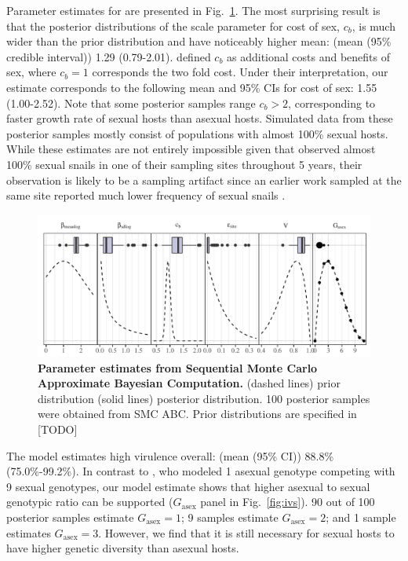 \documentclass{article}\usepackage[]{graphicx}\usepackage[]{color}
\newcommand{\fref}[1]{Fig.~\ref{fig:#1}}
\begin{document}
Parameter estimates for \cite{vergara2014infection} are presented in \fref{smcparam}.
The most surprising result is that the posterior distributions of the scale parameter for cost of sex, $c_b$, is much wider than the prior distribution and have noticeably higher mean: (mean (95\% credible interval)) 1.29 (0.79-2.01).
\cite{ashby2015diversity} defined $c_b$ as additional costs and benefits of sex, where $c_b=1$ corresponds the two fold cost.
Under their interpretation, our estimate corresponds to the following mean and 95\% CIs for cost of sex: 1.55 (1.00-2.52).
Note that some posterior samples range $c_b > 2$, corresponding to faster growth rate of sexual hosts than asexual hosts.
Simulated data from these posterior samples mostly consist of populations with almost 100\% sexual hosts.
While these estimates are not entirely impossible given that \cite{vergara2014infection} observed almost 100\% sexual snails in one of their sampling sites throughout 5 years, their observation is likely to be a sampling artifact since an earlier work sampled at the same site reported much lower frequency of sexual snails \citep{vergara2013geographic}. %

\begin{figure}[!htp]
\includegraphics[width=\textwidth]{../fig/verg_post.pdf}
\caption{{\bf Parameter estimates from Sequential Monte Carlo Approximate Bayesian Computation.}
(dashed lines) prior distribution (solid lines) posterior distribution. 100 posterior samples were obtained from SMC ABC. Prior distributions are specified in [TODO]
}
\label{fig:smcparam}
\end{figure}

The model estimates high virulence overall: (mean (95\% CI)) 88.8\% (75.0\%-99.2\%).
In contrast to \cite{lively2010epidemiological}, who modeled 1 asexual genotype competing with 9 sexual genotypes, our model estimate shows that higher asexual to sexual genotypic ratio can be supported ($G_{\textrm{asex}}$ panel in \fref{ivs}).
90 out of 100 posterior samples estimate $G_{\textrm{asex}} = 1$; 9 samples estimate $G_{\textrm{asex}} = 2$; and 1 sample estimates $G_{\textrm{asex}} = 3$.
However, we find that it is still necessary for sexual hosts to have higher genetic diversity than asexual hosts.
\end{document}
